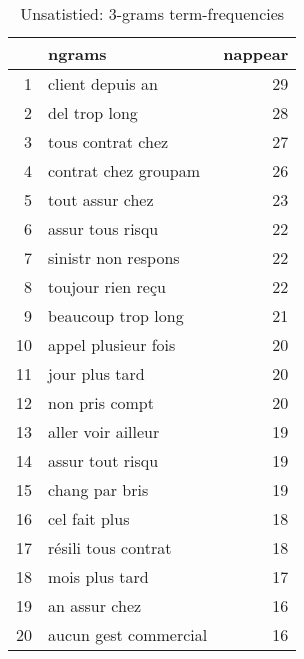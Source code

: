 \begin{table}[ht]
\centering
\begin{tabular}{rlr}
  \hline
 & ngrams & nappear \\ 
  \hline
1 & client depuis an &  29 \\ 
  2 & del trop long &  28 \\ 
  3 & tous contrat chez &  27 \\ 
  4 & contrat chez groupam &  26 \\ 
  5 & tout assur chez &  23 \\ 
  6 & assur tous risqu &  22 \\ 
  7 & sinistr non respons &  22 \\ 
  8 & toujour rien reçu &  22 \\ 
  9 & beaucoup trop long &  21 \\ 
  10 & appel plusieur fois &  20 \\ 
  11 & jour plus tard &  20 \\ 
  12 & non pris compt &  20 \\ 
  13 & aller voir ailleur &  19 \\ 
  14 & assur tout risqu &  19 \\ 
  15 & chang par bris &  19 \\ 
  16 & cel fait plus &  18 \\ 
  17 & résili tous contrat &  18 \\ 
  18 & mois plus tard &  17 \\ 
  19 & an assur chez &  16 \\ 
  20 & aucun gest commercial &  16 \\ 
   \hline
\end{tabular}
\caption{Unsatistied: 3-grams term-frequencies} 
\label{tab:tf_inf_3}
\end{table}
